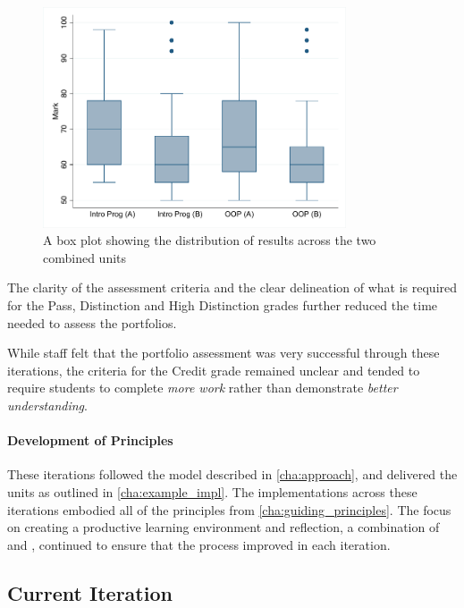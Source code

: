 \begin{figure}[htbp]
  \centering
  \includegraphics[width=0.8\textwidth]{CombinedUnitsBox}
  \caption{A box plot showing the distribution of results across the two combined units}
  \label{fig:combined_box}
\end{figure}

The clarity of the assessment criteria and the clear delineation of what is required for the Pass, Distinction and High Distinction grades further reduced the time needed to assess the portfolios.

While staff felt that the portfolio assessment was very successful through these iterations, the criteria for the Credit grade remained unclear and tended to require students to complete \emph{more work} rather than demonstrate \emph{better understanding}.

\paragraph{Development of Principles} %

These iterations followed the model described in \cref{cha:approach}, and delivered the units as outlined in \cref{cha:example_impl}. The implementations across these iterations embodied all of the principles from \cref{cha:guiding_principles}. The focus on creating a productive learning environment and reflection, a combination of  and , continued to ensure that the process improved in each iteration.



\subsection{Current Iteration} %

